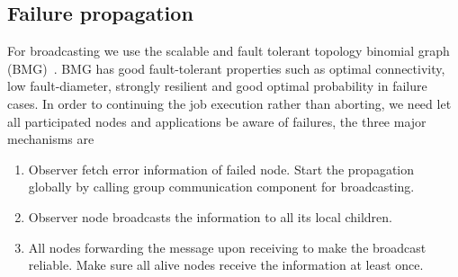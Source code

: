 \documentclass[sigconf]{acmart}
\begin{document}
\subsection{Failure propagation}
For broadcasting we use the scalable and fault tolerant topology binomial graph (BMG)~\cite{Angskun07}. BMG has good fault-tolerant properties such as optimal connectivity, low fault-diameter, strongly resilient and good optimal probability in failure cases. In order to continuing the job execution rather than aborting, we need let all participated nodes and applications be aware of failures, the three major mechanisms are 
\begin{enumerate}
  \item Observer fetch error information of failed node. Start the propagation globally by calling group communication component for broadcasting.
  \item Observer node broadcasts the information to all its local children. 
  \item All nodes forwarding the message upon receiving to make the broadcast reliable. Make sure all alive nodes receive the information at least once. 
\end{enumerate}
\end{document}
